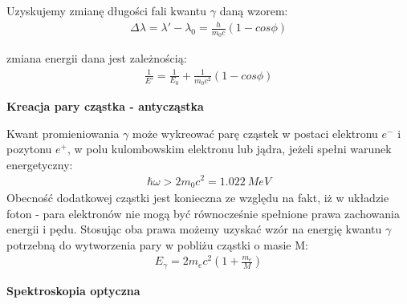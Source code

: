 \documentclass{article}
\begin{document}
\begin{enumerate}
\vspace{0.5cm}
Uzyskujemy zmianę długości fali kwantu $\gamma$ daną wzorem:
 \begin{gather*}
\Delta\lambda=\lambda'-\lambda_0=\frac{h}{m_0c}(1- cos{\phi})
\end{gather*}

zmiana energii dana jest zależnością:
 \begin{gather*}
\frac{1}{E'}=\frac{1}{E_{0}}+\frac{1}{m_0c^2}(1- cos{\phi})
\end{gather*}



{\bf Kreacja pary cząstka - antycząstka}

Kwant promieniowania $\gamma$ może wykreować parę cząstek w postaci elektronu $e^-$ i pozytonu $e^+$, w polu kulombowskim elektronu lub jądra, jeżeli spełni warunek energetyczny:
 \begin{gather*}
\hbar\omega >2m_0c^2 = 1.022\ MeV
\end{gather*}
Obecność dodatkowej cząstki jest konieczna ze względu na fakt, iż w układzie foton - para elektronów nie mogą być równocześnie  spełnione prawa zachowania energii i pędu. Stosując oba prawa możemy uzyskać wzór na energię kwantu $\gamma$ potrzebną do wytworzenia pary w pobliżu cząstki o masie M:
 \begin{gather*}
E_{\gamma}=2m_ec^2\left ( 1+\frac{m_e}{M} \right )
\end{gather*}
\begin{center}
\end{center}



{\bf Spektroskopia optyczna}


\end{enumerate}
\end{document}
